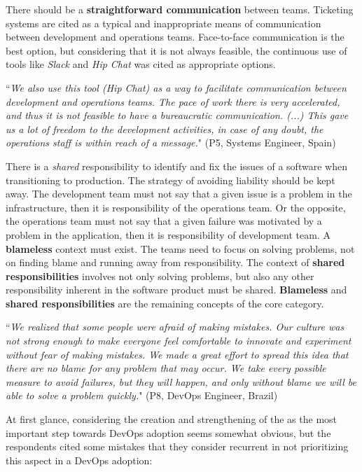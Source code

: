 There should be a \textbf{straightforward communication} between teams. Ticketing
systems are cited as a typical and inappropriate means of communication
between development and operations teams. Face-to-face communication is the best
option, but considering that it is not always feasible, the continuous use of
tools like \emph{Slack} and \emph{Hip Chat} was cited as appropriate options.

\begin{mq}
``\emph{We also use this tool (Hip Chat) as a way to facilitate communication between
development and operations teams. The pace of work there is very accelerated, and thus
it is not feasible to have a bureaucratic communication. (...) This gave us a lot of
freedom to the development activities, in case of any doubt, the operations staff
is within reach of a message.}" (P5, Systems Engineer, Spain)
\end{mq}

There is a \emph{shared} responsibility to identify and fix the issues
of a software when transitioning to production. The strategy of avoiding liability should be kept away.
The development team must not say that a given issue is a problem in the infrastructure, then
it is responsibility of the operations team. Or the opposite, the operations team
must not say that a given failure was motivated by a problem in the application, then it is
responsibility of development team. A \textbf{blameless} context must exist.
The teams need to focus on solving problems, not on finding blame and
running away from responsibility. The context of \textbf{shared
responsibilities} involves not only solving problems, but also any other
responsibility inherent in the software product must be shared.
\textbf{Blameless} and \textbf{shared responsibilities} are the remaining
concepts of the core category.

\begin{mq}
``\emph{We realized that some people were afraid of making mistakes. Our
culture was not strong enough to make everyone feel comfortable to innovate and
experiment without fear of making mistakes. We made a great effort to spread
this idea that there are no blame for any problem that may occur. We take every possible
measure to avoid failures, but they
will happen, and only without blame we will be able to solve a problem quickly.}" (P8,
DevOps Engineer, Brazil)
\end{mq}

At first glance, considering the creation and strengthening of the \cc as the most important step towards DevOps adoption seems somewhat obvious, but
the respondents cited some mistakes that they consider recurrent in not
prioritizing this aspect in a DevOps adoption:


